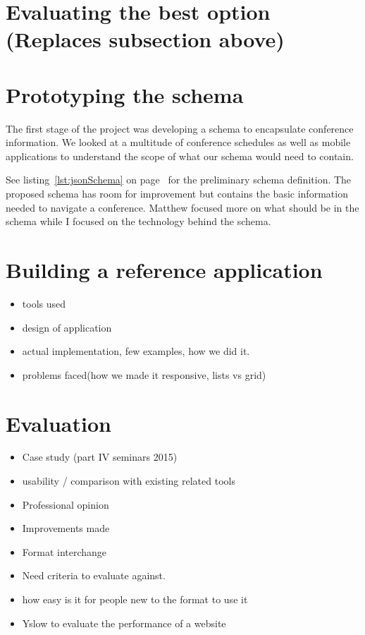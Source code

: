 \documentclass{article}
\begin{document}
\section{Evaluating the best option (Replaces subsection above)}

\section{Prototyping the schema}
The first stage of the project was developing a schema to encapsulate conference information. We looked at a multitude of conference schedules as well as mobile applications to understand the scope of what our schema would need to contain.

See listing~\ref{lst:jsonSchema} on page~\pageref{lst:jsonSchema} for the preliminary schema definition. The proposed schema has room for improvement but contains the basic information needed to navigate a conference. Matthew focused more on what should be in the schema while I focused on the technology behind the schema.

\section{Building a reference application}
\begin{itemize}
\item tools used
\item design of application
\item actual implementation, few examples, how we did it. 
\item problems faced(how we made it responsive, lists vs grid)
\end{itemize}

\section{Evaluation}
\begin{itemize}
\item Case study (part IV seminars 2015)
\item usability / comparison with existing related tools
\item Professional opinion
\item Improvements made
\item Format interchange 
\item Need criteria to evaluate against. 
\item how easy is it for people new to the format to use it
\item Yslow to evaluate the performance of a website
\end{itemize}
\end{document}
